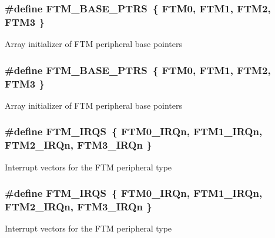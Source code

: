 \subsubsection[{\texorpdfstring{F\+T\+M\+\_\+\+B\+A\+S\+E\+\_\+\+P\+T\+RS}{FTM_BASE_PTRS}}]{\setlength{\rightskip}{0pt plus 5cm}\#define F\+T\+M\+\_\+\+B\+A\+S\+E\+\_\+\+P\+T\+RS~\{ {\bf F\+T\+M0}, {\bf F\+T\+M1}, {\bf F\+T\+M2}, {\bf F\+T\+M3} \}}\hypertarget{group__FTM__Peripheral__Access__Layer_ga1a5a7cb39d1713239478a1ebce2f05cc}{}\label{group__FTM__Peripheral__Access__Layer_ga1a5a7cb39d1713239478a1ebce2f05cc}
Array initializer of F\+TM peripheral base pointers 
\subsubsection[{\texorpdfstring{F\+T\+M\+\_\+\+B\+A\+S\+E\+\_\+\+P\+T\+RS}{FTM_BASE_PTRS}}]{\setlength{\rightskip}{0pt plus 5cm}\#define F\+T\+M\+\_\+\+B\+A\+S\+E\+\_\+\+P\+T\+RS~\{ {\bf F\+T\+M0}, {\bf F\+T\+M1}, {\bf F\+T\+M2}, {\bf F\+T\+M3} \}}\hypertarget{group__FTM__Peripheral__Access__Layer_ga1a5a7cb39d1713239478a1ebce2f05cc}{}\label{group__FTM__Peripheral__Access__Layer_ga1a5a7cb39d1713239478a1ebce2f05cc}
Array initializer of F\+TM peripheral base pointers 
\subsubsection[{\texorpdfstring{F\+T\+M\+\_\+\+I\+R\+QS}{FTM_IRQS}}]{\setlength{\rightskip}{0pt plus 5cm}\#define F\+T\+M\+\_\+\+I\+R\+QS~\{ {\bf F\+T\+M0\+\_\+\+I\+R\+Qn}, {\bf F\+T\+M1\+\_\+\+I\+R\+Qn}, {\bf F\+T\+M2\+\_\+\+I\+R\+Qn}, {\bf F\+T\+M3\+\_\+\+I\+R\+Qn} \}}\hypertarget{group__FTM__Peripheral__Access__Layer_ga2d6f3040cb83685eaa149fb202e070b5}{}\label{group__FTM__Peripheral__Access__Layer_ga2d6f3040cb83685eaa149fb202e070b5}
Interrupt vectors for the F\+TM peripheral type 
\subsubsection[{\texorpdfstring{F\+T\+M\+\_\+\+I\+R\+QS}{FTM_IRQS}}]{\setlength{\rightskip}{0pt plus 5cm}\#define F\+T\+M\+\_\+\+I\+R\+QS~\{ {\bf F\+T\+M0\+\_\+\+I\+R\+Qn}, {\bf F\+T\+M1\+\_\+\+I\+R\+Qn}, {\bf F\+T\+M2\+\_\+\+I\+R\+Qn}, {\bf F\+T\+M3\+\_\+\+I\+R\+Qn} \}}\hypertarget{group__FTM__Peripheral__Access__Layer_ga2d6f3040cb83685eaa149fb202e070b5}{}\label{group__FTM__Peripheral__Access__Layer_ga2d6f3040cb83685eaa149fb202e070b5}
Interrupt vectors for the F\+TM peripheral type 